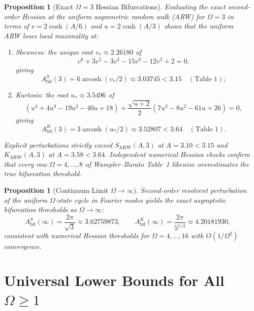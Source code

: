 \documentclass[11pt]{article}
\newtheorem{proposition}[theorem]{Proposition}
\theoremstyle{definition}
\theoremstyle{remark}
\DeclareMathOperator{\arcosh}{arcosh}
\begin{document}
\begin{proposition}[Exact $\Omega = 3$ Hessian Bifurcations]\label{prop:omega3}
Evaluating the exact second-order Hessian at the uniform asymmetric random walk (ARW) for $\Omega = 3$ in terms of $v = 2\cosh(A/6)$ and $u = 2\cosh(A/3)$ shows that the uniform ARW loses local maximality at:
\begin{enumerate}[leftmargin=2em,itemsep=3pt]
  \item \emph{Skewness:} the unique root $v_* \approx 2.26180$ of
  \[
    v^6 + 3v^5 - 3v^4 - 15v^3 - 12v^2 + 2 = 0,
  \]
  giving
  \[
    A_{\mathrm{bif}}^S(3) = 6\arcosh(v_*/2) \approx 3.03745 < 3.15 \quad (\text{Table~1});
  \]
  \item \emph{Kurtosis:} the root $u_* \approx 3.5496$ of
  \[
    (u^4 + 4u^3 - 19u^2 - 40u + 18) + \frac{\sqrt{u+2}}{2}(7u^3 - 8u^2 - 61u + 26) = 0,
  \]
  giving
  \[
    A_{\mathrm{bif}}^K(3) = 3\arcosh(u_*/2) \approx 3.52807 < 3.64 \quad (\text{Table~1}).
  \]
\end{enumerate}
Explicit perturbations strictly exceed $S_{\mathrm{ARW}}(A,3)$ at $A = 3.10 < 3.15$ and $K_{\mathrm{ARW}}(A,3)$ at $A = 3.58 < 3.64$. Independent numerical Hessian checks confirm that every row $\Omega = 4, \dots, 8$ of Wampler--Barato Table~1 likewise overestimates the true bifurcation threshold.
\end{proposition}

\begin{proposition}[Continuum Limit $\Omega \to \infty$]\label{prop:continuum}
Second-order resolvent perturbation of the uniform $\Omega$-state cycle in Fourier modes yields the exact asymptotic bifurcation thresholds as $\Omega \to \infty$:
\[
  A_{\mathrm{bif}}^S(\infty) = \frac{2\pi}{\sqrt{3}} \approx 3.62759873,
  \qquad
  A_{\mathrm{bif}}^K(\infty) = \frac{2\pi}{5^{1/4}} \approx 4.20181930,
\]
consistent with numerical Hessian thresholds for $\Omega = 4, \dots, 16$ with $O(1/\Omega^2)$ convergence.
\end{proposition}

\section{Universal Lower Bounds for All \texorpdfstring{$\Omega \ge 1$}{Omega >= 1}}\label{sec:lower}
\end{document}
